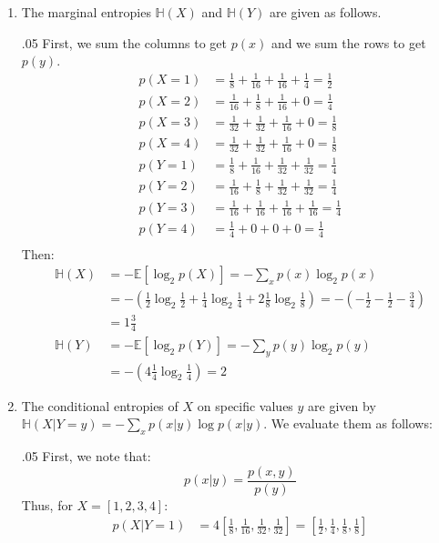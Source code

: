 \documentclass[11pt,twoside]{article}
\newcommand{\pts}[1]{\marginpar{ \small\hspace{0pt} \textit{[#1]} } }
\newcommand{\lt}{\left}
\newcommand{\rt}{\right}
\newcommand{\?}{\stackrel{?}{=}}
\newcommand{\fr}{\frac}
\newcommand{\bl}{\color{blue}}
\newenvironment{solution}{\begin{adjustwidth}{.05\textwidth}{}\bl}{\medskip\end{adjustwidth}}
\begin{document}
\begin{enumerate}[\bf (a)]
\item The marginal entropies $\mathbb{H}(X)$ and $\mathbb{H}(Y)$ are given as follows. \pts{4}
  \begin{solution}
  First, we sum the columns to get $p(x)$ and we sum the rows to get $p(y)$.
  \begin{align*}
    p(X=1) &= \fr18 + \fr1{16} + \fr1{16} + \fr14 = \fr12 \\
    p(X=2) &= \fr1{16} + \fr1{8} + \fr1{16} + 0 = \fr14 \\
    p(X=3) &= \fr1{32} + \fr1{32} + \fr1{16} + 0 = \fr18 \\
    p(X=4) &= \fr1{32} + \fr1{32} + \fr1{16} + 0 = \fr18 \\
    p(Y=1) &= \fr18 + \fr1{16} +  \fr1{32} +  \fr1{32} = \fr14 \\
    p(Y=2) &= \fr1{16} + \fr1{8} + \fr1{32} +  \fr1{32} = \fr14 \\
    p(Y=3) &= \fr1{16} + \fr1{16} + \fr1{16} + \fr1{16} = \fr14 \\
    p(Y=4) &= \fr1{4} + 0 + 0 + 0 = \fr14 \\    
  \end{align*}
  Then:
    \begin{align*}
      \mathbb{H}(X) &= -\mathbb{E}[\log_{2}p(X)] = -\sum_{x}p(x)\log_{2}p(x) \\
                    &= -\lt(\fr12\log_{2}\fr12 + \fr14\log_{2}\fr14 + 2\fr18\log_{2}\fr18 \rt) 
                    = -\lt(-\fr12 -\fr12 -\fr34\rt) \\
                    &= 1\tfrac34 \\
      \mathbb{H}(Y) &= -\mathbb{E}[\log_{2}p(Y)] = -\sum_{y}p(y)\log_{2}p(y) \\
                    &= -\lt( 4\fr14\log_{2}\fr14 \rt) = 2
    \end{align*}
  \end{solution}
\item The \pts{4} conditional entropies of $X$ on specific values $y$  are given by $\mathbb{H}(X|Y = y) = -\sum_{x} p(x|y)\log p(x|y)$. We evaluate them as follows:
  \begin{solution}
    First, we note that:
    \begin{equation*}
      p(x|y) = \fr{p(x,y)}{p(y)}
    \end{equation*}
    Thus, for $X = [1, 2, 3, 4]$:
    \begin{align*}
      p(X|Y= 1) &= 4\lt[\fr18, \fr1{16}, \fr 1{32}, \fr1{32}\rt] = \lt[\fr12, \fr14, \fr18, \fr18 \rt] \\

\end{align*}
\end{solution}
\end{enumerate}
\end{document}
